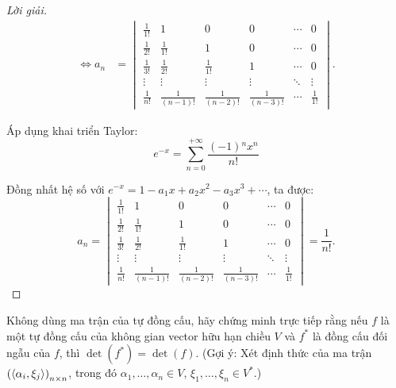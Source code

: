 \documentclass[class=nhvh-linear-algebra,crop=false]{standalone}
\begin{document}
\begin{proof}[Lời giải]
\begin{align*}
		\Longleftrightarrow a_{n} & =
		\begin{vmatrix}
			\frac{1}{1!} & 1                & 0                & 0                & \cdots & 0            \\
			\frac{1}{2!} & \frac{1}{1!}     & 1                & 0                & \cdots & 0            \\
			\frac{1}{3!} & \frac{1}{2!}     & \frac{1}{1!}     & 1                & \cdots & 0            \\
			\vdots       & \vdots           & \vdots           & \vdots           & \ddots & \vdots       \\
			\frac{1}{n!} & \frac{1}{(n-1)!} & \frac{1}{(n-2)!} & \frac{1}{(n-3)!} & \cdots & \frac{1}{1!}
		\end{vmatrix}.
	\end{align*}

	\par Áp dụng khai triển Taylor:
	\[
		e^{-x} = \sum^{+\infty}_{n=0}\frac{(-1){}^{n}x^{n}}{n!}
	\]
	\par Đồng nhất hệ số với $e^{-x} = 1 - a_{1}x + a_{2}x^{2} - a_{3}x^{3} + \cdots$, ta được:
	\[
		a_{n} =
		\begin{vmatrix}
			\frac{1}{1!} & 1                & 0                & 0                & \cdots & 0            \\
			\frac{1}{2!} & \frac{1}{1!}     & 1                & 0                & \cdots & 0            \\
			\frac{1}{3!} & \frac{1}{2!}     & \frac{1}{1!}     & 1                & \cdots & 0            \\
			\vdots       & \vdots           & \vdots           & \vdots           & \ddots & \vdots       \\
			\frac{1}{n!} & \frac{1}{(n-1)!} & \frac{1}{(n-2)!} & \frac{1}{(n-3)!} & \cdots & \frac{1}{1!}
		\end{vmatrix}
		= \frac{1}{n!}.
	\]
\end{proof}

\begin{exercise}
	\par Không dùng ma trận của tự đồng cấu, hãy chứng minh trực tiếp rằng nếu $f$ là một tự đồng cấu của không gian vector hữu hạn chiều $V$ và $f^{*}$ là đồng cấu đối ngẫu của $f$, thì $\det(f^{*}) = \det(f)$. (Gợi ý: Xét định thức của ma trận ${\left(\left\langle{\alpha_{i},\xi_{j}}\right\rangle\right)}_{n\times n}$, trong đó $\alpha_{1},\ldots,\alpha_{n}\in V$, $\xi_{1},\ldots ,\xi_{n}\in V^{*}$.)
\end{exercise}
\end{document}
